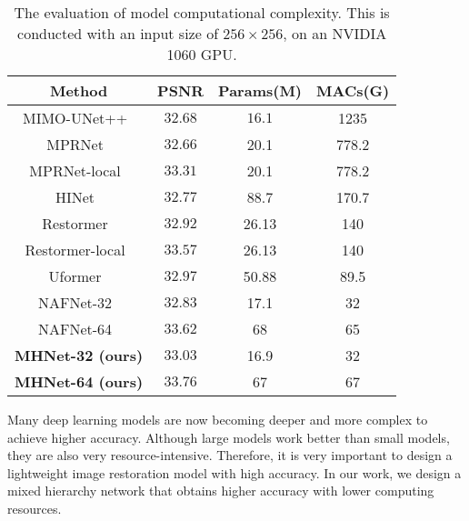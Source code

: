 \documentclass[lettersize,journal]{IEEEtran}
\begin{document}
\begin{table}
\centering
\caption{The evaluation of model computational complexity. This is conducted with an input size of $256 \times 256$, on an NVIDIA 1060 GPU. \label{tb:04}}

\begin{tabular}{ccccc}
\hline
\multicolumn{2}{c}{Method} & \multicolumn{1}{c}{PSNR} & \multicolumn{1}{c}{Params(M)} & \multicolumn{1}{c}{MACs(G)} 
\\
\hline\hline
\multicolumn{2}{c}{MIMO-UNet++~\cite{2021Rethinking}}  & \multicolumn{1}{c}{$32.68$} & \multicolumn{1}{c}{$16.1$}  & \multicolumn{1}{c}{1235} 
\\
\multicolumn{2}{c}{MPRNet~\cite{Zamir2021MPRNet}}  & \multicolumn{1}{c}{$32.66$} & \multicolumn{1}{c}{20.1}  & \multicolumn{1}{c}{778.2}  
\\
\multicolumn{2}{c}{MPRNet-local~\cite{Zamir2021MPRNet}}  & \multicolumn{1}{c}{$33.31$} & \multicolumn{1}{c}{20.1}  & \multicolumn{1}{c}{778.2}  
\\
\multicolumn{2}{c}{HINet~\cite{Chen_2021_CVPR}}  & \multicolumn{1}{c}{$32.77$} & \multicolumn{1}{c}{88.7}  & \multicolumn{1}{c}{170.7} 
\\
\multicolumn{2}{c}{Restormer~\cite{Zamir2021Restormer}}  & \multicolumn{1}{c}{$32.92$} & \multicolumn{1}{c}{26.13}  & \multicolumn{1}{c}{140} 
\\
\multicolumn{2}{c}{Restormer-local~\cite{Zamir2021Restormer}}  & \multicolumn{1}{c}{$33.57$} & \multicolumn{1}{c}{26.13}  & \multicolumn{1}{c}{140} 
\\
\multicolumn{2}{c}{Uformer~\cite{Wang_2022_CVPR}}  & \multicolumn{1}{c}{$32.97$} & \multicolumn{1}{c}{50.88}  & \multicolumn{1}{c}{89.5} 
\\
\hline
\multicolumn{2}{c}{NAFNet-32~\cite{chen2022simple}}  & \multicolumn{1}{c}{$32.83$} & \multicolumn{1}{c}{17.1}  & \multicolumn{1}{c}{32}
\\
\multicolumn{2}{c}{NAFNet-64~\cite{chen2022simple}}  & \multicolumn{1}{c}{$33.62$} & \multicolumn{1}{c}{68}  & \multicolumn{1}{c}{65}
\\
\hline
\multicolumn{2}{c}{\textbf{MHNet-32 (ours)}}  & \multicolumn{1}{c}{$33.03$} & \multicolumn{1}{c}{16.9}  & \multicolumn{1}{c}{32}
\\
\multicolumn{2}{c}{\textbf{MHNet-64 (ours)}}  & \multicolumn{1}{c}{$33.76$} & \multicolumn{1}{c}{67}  & \multicolumn{1}{c}{67}
\\
\hline
\end{tabular}
\end{table}
Many deep learning models are now becoming deeper and more complex to achieve higher accuracy. Although large models work better than small models, they are also very resource-intensive. Therefore, it is very important to design a lightweight image restoration model with high accuracy. In our work, we design a mixed hierarchy network that obtains higher accuracy with lower computing resources. 
\end{document}
